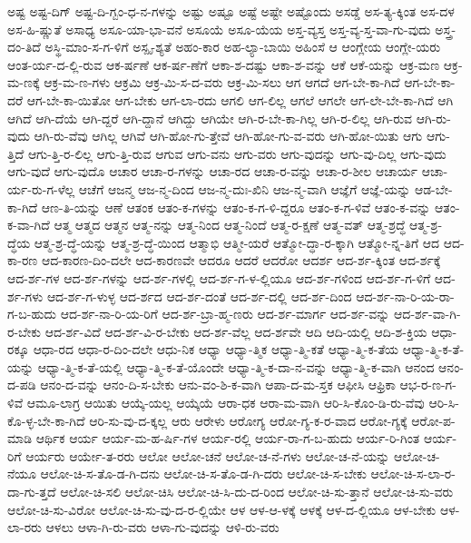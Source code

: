 {ಅಷ್ಟ
ಅಷ್ಟ-ದಿಗ್
ಅಷ್ಟ-ದಿ-ಗ್ಬಂ-ಧ-ನ-ಗಳನ್ನು
ಅಷ್ಟು
ಅಷ್ಟೂ
ಅಷ್ಟೆ
ಅಷ್ಟೇ
ಅಷ್ಟೊಂದು
ಅಸಡ್ಡೆ
ಅಸ-ತ್ಯ-ಕ್ಕಿಂತ
ಅಸ-ದಳ
ಅಸ-ಹಿ-ಷ್ಣುತೆ
ಅಸಾಧ್ಯ
ಅಸೂ-ಯಾ-ಭಾ-ವನೆ
ಅಸೂಯೆ
ಅಸೂ-ಯೆಯ
ಅಸ್ತ-ವ್ಯಸ್ತ
ಅಸ್ತ-ವ್ಯ-ಸ್ತ-ವಾ-ಗು-ವುದು
ಅಸ್ತ್ರ-ದಂ-ತಿದೆ
ಅಸ್ಥಿ-ಮಾಂ-ಸ-ಗ-ಳಿಗೆ
ಅಸ್ಪೃ-ಶ್ಯತೆ
ಅಹಂ-ಕಾರ
ಅಹ-ಲ್ಯಾ-ಬಾಯಿ
ಅಹಿಂಸೆ
ಆ
ಆಂಗ್ಲೇಯ
ಆಂಗ್ಲೇ-ಯರು
ಆಂತ-ರ್ಯ-ದ-ಲ್ಲಿ-ರುವ
ಆಕ-ರ್ಷಣೆ
ಆಕ-ರ್ಷ-ಣೆಗೆ
ಆಕಾ-ಶ-ದಷ್ಟು
ಆಕಾ-ಶ-ವನ್ನು
ಆಕೆ
ಆಕೆ-ಯನ್ನು
ಆಕ್ರ-ಮಣ
ಆಕ್ರ-ಮ-ಣಕ್ಕೆ
ಆಕ್ರ-ಮ-ಣ-ಗಳು
ಆಕ್ರಮಿ
ಆಕ್ರ-ಮಿ-ಸ-ದ-ವರು
ಆಕ್ರ-ಮಿ-ಸಲು
ಆಗ
ಆಗದೆ
ಆಗ-ಬೇ-ಕಾ-ಗಿದೆ
ಆಗ-ಬೇ-ಕಾ-ದರೆ
ಆಗ-ಬೇ-ಕಾ-ಯಿತೋ
ಆಗ-ಬೇಕು
ಆಗ-ಲಾ-ರದು
ಆಗಲಿ
ಆಗ-ಲಿಲ್ಲ
ಆಗಲೆ
ಆಗಲೇ
ಆಗ-ಲೇ-ಬೇ-ಕಾ-ಗಿದೆ
ಆಗಿ
ಆಗಿದೆ
ಆಗಿ-ದೆಯೆ
ಆಗಿ-ದ್ದರೆ
ಆಗಿ-ದ್ದಾನೆ
ಆಗಿದ್ದು
ಆಗಿಯೇ
ಆಗಿ-ರ-ಬೇ-ಕಾ-ಗಿಲ್ಲ
ಆಗಿ-ರ-ಲಿಲ್ಲ
ಆಗಿ-ರುವ
ಆಗಿ-ರು-ವುದು
ಆಗಿ-ರು-ವೆವು
ಆಗಿಲ್ಲ
ಆಗಿವೆ
ಆಗಿ-ಹೋ-ಗು-ತ್ತೇವೆ
ಆಗಿ-ಹೋ-ಗು-ವ-ವರು
ಆಗಿ-ಹೋ-ಯಿತು
ಆಗು
ಆಗು-ತ್ತಿದೆ
ಆಗು-ತ್ತಿ-ರ-ಲಿಲ್ಲ
ಆಗು-ತ್ತಿ-ರುವ
ಆಗುವ
ಆಗು-ವನು
ಆಗು-ವರು
ಆಗು-ವುದನ್ನು
ಆಗು-ವು-ದಿಲ್ಲ
ಆಗು-ವುದು
ಆಗು-ವುದೆ
ಆಗು-ವುದೊ
ಆಚಾರ
ಆಚಾ-ರ-ಗಳನ್ನು
ಆಚಾ-ರದ
ಆಚಾ-ರ-ವನ್ನು
ಆಚಾ-ರ-ಶೀಲ
ಆಚಾರ್ಯ
ಆಚಾ-ರ್ಯ-ರು-ಗ-ಳೆಲ್ಲ
ಆಚೆಗೆ
ಆಜನ್ಮ
ಆಜ-ನ್ಮ-ದಿಂದ
ಆಜ-ನ್ಮ-ದುಃ-ಖಿನಿ
ಆಜ-ನ್ಮ-ವಾಗಿ
ಆಜ್ಞೆಗೆ
ಆಜ್ಞೆ-ಯನ್ನು
ಆಡ-ಬೇ-ಕಾ-ಗಿದೆ
ಆಣ-ತಿ-ಯನ್ನು
ಆಣೆ
ಆತಂಕ
ಆತಂ-ಕ-ಗಳನ್ನು
ಆತಂ-ಕ-ಗ-ಳಿ-ದ್ದರೂ
ಆತಂ-ಕ-ಗ-ಳಿವೆ
ಆತಂ-ಕ-ವನ್ನು
ಆತಂ-ಕ-ವಾ-ಗಿದೆ
ಆತ್ಮ
ಆತ್ಮದ
ಆತ್ಮನ
ಆತ್ಮ-ನನ್ನು
ಆತ್ಮ-ನಿಂದ
ಆತ್ಮ-ನಿಂದೆ
ಆತ್ಮ-ರ-ಕ್ಷಣೆ
ಆತ್ಮ-ವತ್
ಆತ್ಮ-ಶ್ರದ್ಧೆ
ಆತ್ಮ-ಶ್ರ-ದ್ಧೆಯ
ಆತ್ಮ-ಶ್ರ-ದ್ಧೆ-ಯನ್ನು
ಆತ್ಮ-ಶ್ರ-ದ್ಧೆ-ಯಿಂದ
ಆತ್ಮಾಭಿ
ಆತ್ಮೀ-ಯರೆ
ಆತ್ಮೋ-ದ್ಧಾ-ರ-ಕ್ಕಾಗಿ
ಆತ್ಮೋ-ನ್ನ-ತಿಗೆ
ಆದ
ಆದ-ಕಾ-ರಣ
ಆದ-ಕಾರಣ-ದಿಂ-ದಲೇ
ಆದ-ಕಾರಣವೇ
ಆದರೂ
ಆದರೆ
ಆದರೋ
ಆದರ್ಶ
ಆದ-ರ್ಶ-ಕ್ಕಿಂತ
ಆದ-ರ್ಶಕ್ಕೆ
ಆದ-ರ್ಶ-ಗಳ
ಆದ-ರ್ಶ-ಗಳನ್ನು
ಆದ-ರ್ಶ-ಗಳಲ್ಲಿ
ಆದ-ರ್ಶ-ಗ-ಳ-ಲ್ಲಿಯೂ
ಆದ-ರ್ಶ-ಗಳಿಂದ
ಆದ-ರ್ಶ-ಗ-ಳಿಗೆ
ಆದ-ರ್ಶ-ಗಳು
ಆದ-ರ್ಶ-ಗ-ಳುಳ್ಳ
ಆದ-ರ್ಶದ
ಆದ-ರ್ಶ-ದಂತೆ
ಆದ-ರ್ಶ-ದಲ್ಲಿ
ಆದ-ರ್ಶ-ದಿಂದ
ಆದ-ರ್ಶ-ನಾ-ರಿ-ಯ-ರಾ-ಗ-ಬ-ಹುದು
ಆದ-ರ್ಶ-ನಾ-ರಿ-ಯ-ರಿಗೆ
ಆದ-ರ್ಶ-ಬ್ರಾ-ಹ್ಮ-ಣರು
ಆದ-ರ್ಶ-ಮಾರ್ಗ
ಆದ-ರ್ಶ-ವನ್ನು
ಆದ-ರ್ಶ-ವಾ-ಗಿ-ರ-ಬೇಕು
ಆದ-ರ್ಶ-ವಿದೆ
ಆದ-ರ್ಶ-ವಿ-ರ-ಬೇಕು
ಆದ-ರ್ಶ-ವೆಲ್ಲ
ಆದ-ರ್ಶವೇ
ಆದಿ
ಆದಿ-ಯಲ್ಲಿ
ಆದಿ-ಶ-ಕ್ತಿಯ
ಆಧಾ-ರಕ್ಕೂ
ಆಧಾ-ರದ
ಆಧಾ-ರ-ದಿಂ-ದಲೇ
ಆಧು-ನಿಕ
ಆಧ್ಯಾ
ಆಧ್ಯಾ-ತ್ಮಿಕ
ಆಧ್ಯಾ-ತ್ಮಿ-ಕತೆ
ಆಧ್ಯಾ-ತ್ಮಿ-ಕ-ತೆಯ
ಆಧ್ಯಾ-ತ್ಮಿ-ಕ-ತೆ-ಯನ್ನು
ಆಧ್ಯಾ-ತ್ಮಿ-ಕ-ತೆ-ಯಲ್ಲಿ
ಆಧ್ಯಾ-ತ್ಮಿ-ಕ-ತೆ-ಯೊಂದೇ
ಆಧ್ಯಾ-ತ್ಮಿ-ಕ-ದಾ-ನ-ವನ್ನು
ಆಧ್ಯಾ-ತ್ಮಿ-ಕ-ವಾಗಿ
ಆನಂದ
ಆನಂ-ದ-ಪಡಿ
ಆನಂ-ದ-ವನ್ನು
ಆನಂ-ದಿ-ಸ-ಬೇಕು
ಆನು-ವಂ-ಶಿ-ಕ-ವಾಗಿ
ಆಪಾ-ದ-ಮ-ಸ್ತಕ
ಆಫೀಸಿ
ಆಫ್ರಿಕಾ
ಆಭ-ರ-ಣ-ಗ-ಳಿವೆ
ಆಮೂ-ಲಾಗ್ರ
ಆಯಿತು
ಆಯ್ಕೆ-ಯಲ್ಲ
ಆಯ್ಕೆಯೆ
ಆರಾ-ಧಕ
ಆರಾ-ಮ-ವಾಗಿ
ಆರಿ-ಸಿ-ಕೊಂ-ಡಿ-ರು-ವೆವು
ಆರಿ-ಸಿ-ಕೊ-ಳ್ಳ-ಬೇ-ಕಾ-ಗಿದೆ
ಆರಿ-ಸು-ವು-ದ-ಕ್ಕಲ್ಲ
ಆರು
ಆರೇಳು
ಆರೋಗ್ಯ
ಆರೋ-ಗ್ಯ-ಕ-ರ-ವಾದ
ಆರೋ-ಗ್ಯಕ್ಕೆ
ಆರೋ-ಪ-ಮಾಡಿ
ಆರ್ಥಿಕ
ಆರ್ಯ
ಆರ್ಯ-ಮ-ಹ-ರ್ಷಿ-ಗಳ
ಆರ್ಯ-ರಲ್ಲಿ
ಆರ್ಯ-ರಾ-ಗ-ಬ-ಹುದು
ಆರ್ಯ-ರಿ-ಗಿಂತ
ಆರ್ಯ-ರಿಗೆ
ಆರ್ಯರು
ಆರ್ಯೇ-ತ-ರರು
ಆಲೋ
ಆಲೋ-ಚನೆ
ಆಲೋ-ಚ-ನೆ-ಗಳು
ಆಲೋ-ಚ-ನೆ-ಯನ್ನು
ಆಲೋ-ಚ-ನೆಯೂ
ಆಲೋ-ಚಿ-ಸ-ತೊ-ಡ-ಗಿ-ದನು
ಆಲೋ-ಚಿ-ಸ-ತೊ-ಡ-ಗಿ-ದರು
ಆಲೋ-ಚಿ-ಸ-ಬೇಕು
ಆಲೋ-ಚಿ-ಸ-ಲಾ-ರ-ದಾ-ಗು-ತ್ತದೆ
ಆಲೋ-ಚಿ-ಸಲಿ
ಆಲೋ-ಚಿಸಿ
ಆಲೋ-ಚಿ-ಸಿ-ದು-ದ-ರಿಂದ
ಆಲೋ-ಚಿ-ಸು-ತ್ತಾನೆ
ಆಲೋ-ಚಿ-ಸು-ವರು
ಆಲೋ-ಚಿ-ಸು-ವಿರೋ
ಆಲೋ-ಚಿ-ಸು-ವು-ದ-ರ-ಲ್ಲಿಯೇ
ಆಳ
ಆಳ-ಆ-ಳಕ್ಕೆ
ಆಳಕ್ಕೆ
ಆಳ-ದ-ಲ್ಲಿಯೂ
ಆಳ-ಬೇಕು
ಆಳ-ಲಾ-ರರು
ಆಳಲು
ಆಳಾ-ಗಿ-ರು-ವರು
ಆಳಾ-ಗು-ವುದನ್ನು
ಆಳಿ-ರು-ವರು
}

